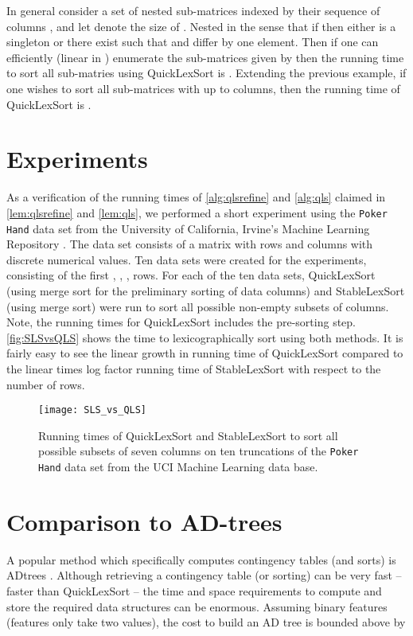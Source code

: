 \documentclass[a4paper,10pt,reqno]{amsart}
\theoremstyle{definition}
\begin{document}
In general consider a set of nested sub-matrices indexed by their sequence of
columns , and let  denote the size of . Nested in
the sense that if  then either  is a singleton or there
exist  such that  and  differ by one element. Then if
one can efficiently (linear in ) enumerate the sub-matrices given
by  then the running time to sort all  sub-matries
using QuickLexSort is .  Extending the previous example,
if one wishes to sort all sub-matrices with up to  columns, then the
running time of QuickLexSort is .



\section{Experiments}
\label{sec:experiments}
As a verification of the running times of \autoref{alg:qlsrefine} and
\autoref{alg:qls} claimed in \autoref{lem:qlsrefine} and \autoref{lem:qls}, we
performed a short experiment using the {\tt Poker Hand} data set from the
University of California, Irvine's Machine Learning Repository
\cite{Bache+Lichman:2013}. The data set consists of a matrix with  rows
and  columns with discrete numerical values. Ten data sets were created for
the experiments, consisting of the first , , , 
rows. For each of the ten data sets, QuickLexSort (using merge sort for the
preliminary sorting of data columns) and StableLexSort (using merge sort) were
run to sort all possible non-empty subsets of  columns. Note, the running
times for QuickLexSort includes the pre-sorting step.
\autoref{fig:SLSvsQLS} shows the time to lexicographically sort using both
methods. It is fairly easy to see the linear growth in running time of
QuickLexSort compared to the linear times log factor running time of StableLexSort with
respect to the number of rows.

\begin{figure}
    \begin{center}
    \texttt{[image: SLS\_vs\_QLS]}
    \end{center}
    \caption{Running times of QuickLexSort and StableLexSort to sort all
    possible subsets of seven columns on ten truncations of the {\tt Poker
Hand} data set from the UCI Machine Learning data base.}
\label{fig:SLSvsQLS}
\end{figure}



\section{Comparison to AD-trees}
\label{sec:adtrees}
A popular method which specifically computes contingency tables (and sorts) is
ADtrees \cite{Moore:1998fk}. Although retrieving a contingency table (or
sorting) can be very fast -- faster than QuickLexSort -- the time and space
requirements to compute and store the required data structures can be enormous. Assuming
binary features (features only take two values), the cost to build an AD
tree is bounded above by 
 
\end{document}
